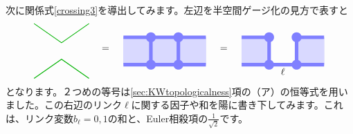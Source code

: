 \documentclass[report,paper=a4, fontsize=12pt, line_length=16cm, number_of_lines=33,dvipdfmx]{jlreq}
\numberwithin{equation}{chapter}
\begin{document}
次に関係式\eqref{crossing3}を導出してみます。左辺を半空間ゲージ化の見方で表すと
\begin{align}
  \begin{tikzpicture}[baseline=0]
      \coordinate(A) at (-1,-1);
      \coordinate(B) at (1,-1);
      \coordinate(C) at (1,1);
      \coordinate(D) at (-1,1);
      \draw[darkgreen,thick] (D)--(0,0.3)--(C);
      \draw[darkgreen,thick] (A)--(0,-0.3)--(B);
  \end{tikzpicture}
  \quad=\quad 
  \begin{tikzpicture}[baseline=0.5cm]
      \foreach \x in {0,1,2}{
          \foreach \y in {-2,-1,...,1}{
          \fill[plaqblue](\x,0) rectangle (\x+1,1);
          }
      }
      \foreach \x in {1,2}{
          \foreach \y in {0,1}{
              \fill[linkblue] (\x,\y) circle (1.8mm);
          }
      }
      \foreach \x/\y in {0/0,1/0,2/0,0/1,1/1,2/1}{
              \draw[linkblue, line width = 1.3mm](\x,\y)--(\x + 1,\y);
      }
      \foreach \x in {1,2}{
          \draw[linkblue, line width = 1.3mm](\x,0)--(\x, 1);
      }
  \end{tikzpicture}
  \quad=\quad 
  \begin{tikzpicture}[baseline=0.5cm]
      \foreach \x in {0,2}{
          \foreach \y in {-2,-1,...,1}{
          \fill[plaqblue](\x,0) rectangle (\x+1,1);
          }
      }
      \foreach \x in {1,2}{
          \foreach \y in {0,1}{
              \fill[linkblue] (\x,\y) circle (1.8mm);
          }
      }
      \foreach \x/\y in {0/0,1/0,2/0,0/1,2/1}{
              \draw[linkblue, line width = 1.3mm](\x,\y)--(\x + 1,\y);
      }
      \foreach \x in {1,2}{
          \draw[linkblue, line width = 1.3mm](\x,0)--(\x, 1);
      }
      \node(L) at (1.5,0)[below]{$\ell$};
  \end{tikzpicture}   
\end{align}
となります。２つめの等号は\ref{sec:KWtopologicalness}項の（ア）の恒等式を用いました。この右辺のリンク$\ell$に関する因子や和を陽に書き下してみます。これは、リンク変数$b_{\ell}=0,1$の和と、Euler相殺項の$\frac{1}{\sqrt{2}}$です。
\end{document}

